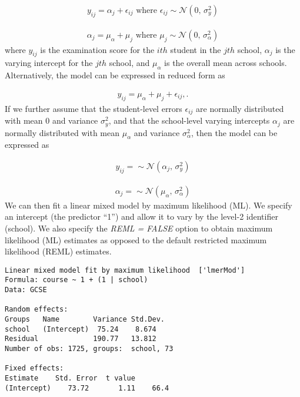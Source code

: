 \begin{align}
	y_{ij} = \alpha_j + \epsilon_{ij} \text{ where } \epsilon_{ij} \sim \mathcal{N}(0,\,\sigma^{2}_y)
\end{align}

\begin{align}
	\alpha_j = \mu_\alpha + \mu_j \text{ where } \mu_j \sim \mathcal{N}(0,\,\sigma^{2}_\alpha)
\end{align}
where $y_{ij}$ is the examination score for the $ith$ student in the $jth$ school, $\alpha_j$ is the varying intercept for the $jth$ school, and $\mu_\alpha$ is the overall mean across schools. Alternatively, the model can be expressed in reduced form as

\begin{align}
	y_{ij} = \mu_\alpha + \mu_j + \epsilon_{ij},.
\end{align}
If we further assume that the student-level errors $\epsilon_{ij}$ are normally distributed with mean $0$ and variance $\sigma^{2}_y$, and that the school-level varying intercepts $\alpha_j$ are normally distributed with mean $\mu_\alpha$ and variance $\sigma^{2}_\alpha$, then the model can be expressed as

\begin{align}
	y_{ij} =  \sim \mathcal{N}(\alpha_j,\,\sigma^{2}_y)
\end{align}

\begin{align}
	\alpha_j =  \sim \mathcal{N}(\mu_\alpha,\,\sigma^{2}_\alpha)
\end{align}
We can then fit a linear mixed model by maximum likelihood (ML). 
We specify an intercept (the predictor “1”) and allow it to vary by the level-2 identifier (school). We also specify the \textit{REML = FALSE} option to obtain maximum likelihood (ML) estimates as opposed to the default restricted maximum likelihood (REML) estimates.

\begin{Verbatim}[frame=single]
Linear mixed model fit by maximum likelihood  ['lmerMod']
Formula: course ~ 1 + (1 | school)
Data: GCSE

Random effects:
Groups   Name        Variance Std.Dev.
school   (Intercept)  75.24    8.674  
Residual             190.77   13.812  
Number of obs: 1725, groups:  school, 73

Fixed effects:
Estimate    Std. Error  t value
(Intercept)    73.72       1.11    66.4

\end{Verbatim}

